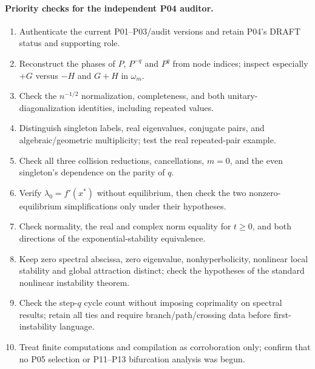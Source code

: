 \paragraph{Priority checks for the independent P04 auditor.}
\begin{enumerate}[label=(\arabic*),leftmargin=*]
\item Authenticate the current P01--P03/audit versions and retain P04's
DRAFT status and supporting role.
\item Reconstruct the phases of $P$, $P^{-q}$ and $P^q$ from node
indices; inspect especially $+G$ versus $-H$ and $G+H$ in $\omega_m$.
\item Check the $n^{-1/2}$ normalization, completeness, and both
unitary-diagonalization identities, including repeated values.
\item Distinguish singleton labels, real eigenvalues, conjugate pairs,
and algebraic/geometric multiplicity; test the real repeated-pair example.
\item Check all three collision reductions, cancellations, $m=0$,
and the even singleton's dependence on the parity of $q$.
\item Verify $\lambda_0=f'(x^*)$ without equilibrium, then check the
two nonzero-equilibrium simplifications only under their hypotheses.
\item Check normality, the real and complex norm equality for $t\ge0$,
and both directions of the exponential-stability equivalence.
\item Keep zero spectral abscissa, zero eigenvalue, nonhyperbolicity,
nonlinear local stability and global attraction distinct; check the
hypotheses of the standard nonlinear instability theorem.
\item Check the step-$q$ cycle count without imposing coprimality on
spectral results; retain all ties and require branch/path/crossing data
before first-instability language.
\item Treat finite computations and compilation as corroboration only;
confirm that no P05 selection or P11--P13 bifurcation analysis was begun.
\end{enumerate}
